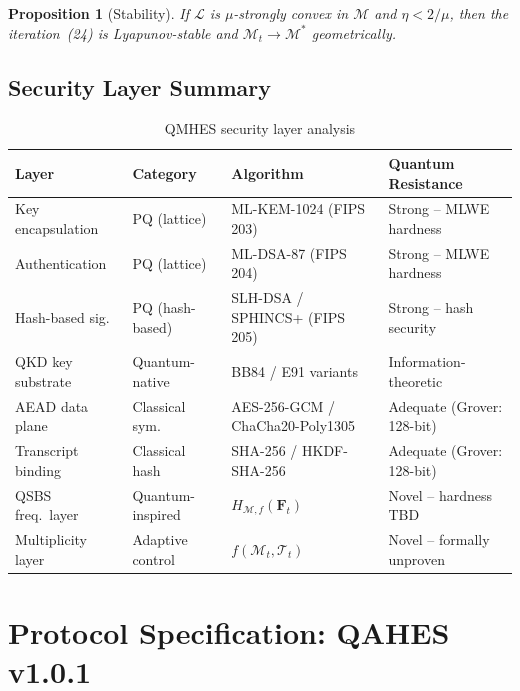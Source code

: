 \documentclass[12pt,letterpaper]{article}
\theoremstyle{plain}
\newtheorem{proposition}[theorem]{Proposition}
\theoremstyle{definition}
\begin{document}
\begin{proposition}[Stability]
If $\mathcal{L}$ is $\mu$-strongly convex in $\mathcal{M}$ and $\eta < 2/\mu$,
then the iteration~(24) is Lyapunov-stable and $\mathcal{M}_t \to \mathcal{M}^*$
geometrically.
\end{proposition}

\subsection{Security Layer Summary}

\begin{table}[H]
\centering
\caption{QMHES security layer analysis}
\begin{tabular}{lllp{5cm}}
\toprule
\textbf{Layer} & \textbf{Category} & \textbf{Algorithm} & \textbf{Quantum Resistance} \\
\midrule
Key encapsulation   & PQ (lattice)     & ML-KEM-1024 (FIPS 203) &
  Strong -- MLWE hardness \\
Authentication      & PQ (lattice)     & ML-DSA-87 (FIPS 204) &
  Strong -- MLWE hardness \\
Hash-based sig.     & PQ (hash-based)  & SLH-DSA / SPHINCS+ (FIPS 205) &
  Strong -- hash security \\
QKD key substrate   & Quantum-native   & BB84 / E91 variants &
  Information-theoretic \\
AEAD data plane     & Classical sym.   & AES-256-GCM / ChaCha20-Poly1305 &
  Adequate (Grover: 128-bit) \\
Transcript binding  & Classical hash   & SHA-256 / HKDF-SHA-256 &
  Adequate (Grover: 128-bit) \\
QSBS freq.\ layer   & Quantum-inspired & $H_{\mathcal{M},f}(\mathbf{F}_t)$ &
  Novel -- hardness TBD \\
Multiplicity layer  & Adaptive control & $f(\mathcal{M}_t, \mathcal{T}_t)$ &
  Novel -- formally unproven \\
\bottomrule
\end{tabular}
\end{table}

\section{Protocol Specification: QAHES v1.0.1}
\label{sec:protocol}
\end{document}

